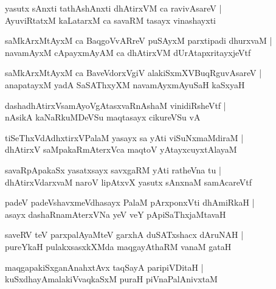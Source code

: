 \documentclass[twoside,12pt,openright]{book}
\newcounter{shloka}[chapter]
\begin{document}
\begin{shloka}%
yasutx sAnxti tathAshAnxti dhAtirxVM ca ravivAsareV |\\
AyuviRtatxM kaLatarxM ca savaRM tasayx vinashayxti 
\end{shloka}

\begin{shloka}%
saMkArxMtAyxM ca BaqgoVvARreV puSAyxM parxtipadi dhurxvaM |\\
navamAyxM cApayxmAyAM ca dhAtirxVM dUrAtapxritayxjeVtf
\end{shloka}

\begin{shloka}%
saMkArxMtAyxM ca BaveVdorxVgiV alakiSxmXVBuqRguvAsareV |\\
anapatayxM yadA SaSAThxyXM navamAyxmAyuSaH kaSxyaH 
\end{shloka}

\begin{shloka}%
dashadhAtirxVsamAyoVgAtasxvaRnAshaM vinidiRsheVtf |\\
nAsikA kaNaRkuMDeVSu maqtasayx cikureVSu vA 
\end{shloka}

\begin{shloka}%
tiSeThxVdAdhxtirxVPalaM yasayx sa yAti viSuNxmaMdiraM |\\
dhAtirxV saMpakaRmAterxVca maqtoV yAtayxcuyxtAlayaM 
\end{shloka}

\begin{shloka}%
savaRpApakaSx yasatxsayx savxgaRM yAti ratheVna tu |\\
dhAtirxVdarxvaM naroV lipAtxvX yasutx sAnxnaM samAcareVtf
\end{shloka}

\begin{shloka}%
padeV padeVshavxmeVdhasayx PalaM pArxponxVti dhAmiRkaH |\\
asayx dashaRnamAterxVNa yeV veY pApiSaThxjaMtavaH 
\end{shloka}

\begin{shloka}%
saveRV teV parxpalAyaMteV garxhA duSATxshacx dAruNAH |\\
pureYkaH pulakxsasxkXMda maqgayAthaRM vanaM gataH
\end{shloka}

\begin{shloka}%
maqgapakiSxganAnahxtAvx taqSayA paripiVDitaH |\\
kuSxdhayAmalakiVvaqkaSxM puraH piVnaPalAnivxtaM 
\end{shloka}
\end{document}
